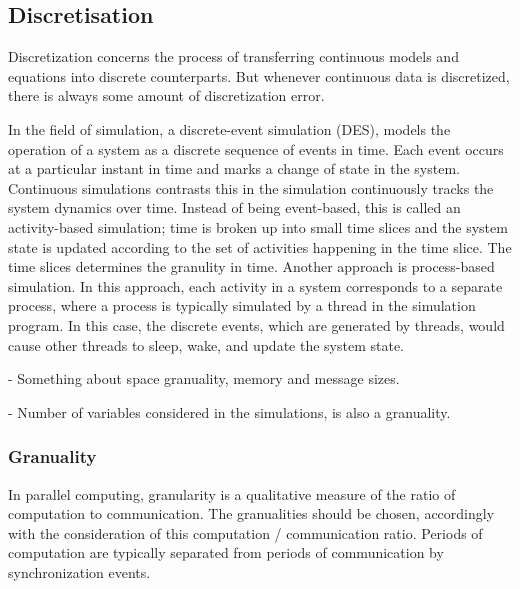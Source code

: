 \subsection{Discretisation}
\label{dis}

Discretization concerns the process of transferring continuous models and equations into discrete counterparts. But whenever continuous data is discretized, there is always some amount of discretization error.

In the field of simulation, a discrete-event simulation (DES), models the operation of a system as a discrete sequence of events in time. Each event occurs at a particular instant in time and marks a change of state in the system.
Continuous simulations contrasts this in the simulation continuously tracks the system dynamics over time. Instead of being event-based, this is called an activity-based simulation; time is broken up into small time slices and the system state is updated according to the set of activities happening in the time slice. The time slices determines the granulity in time.
Another approach is process-based simulation. In this approach, each activity in a system corresponds to a separate process, where a process is typically simulated by a thread in the simulation program. In this case, the discrete events, which are generated by threads, would cause other threads to sleep, wake, and update the system state.

- Something about space granuality, memory and message sizes.

- Number of variables considered in the simulations, is also a granuality.

\subsubsection{Granuality}
In parallel computing, granularity is a qualitative measure of the ratio of computation to communication. The granualities should be chosen, accordingly with the consideration of this computation / communication ratio. Periods of computation are typically separated from periods of communication by synchronization events.

